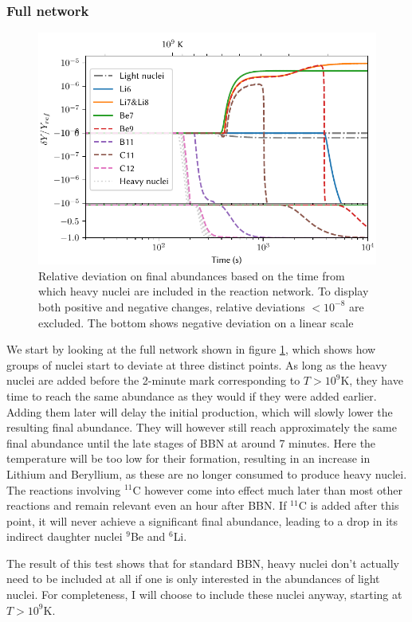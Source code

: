 \subsubsection{Full network}
\begin{figure}[ht!]
    \includegraphics[width=5.1in]{figures/Bignettime.pdf}
    \caption{Relative deviation on final abundances based on the time from which heavy nuclei are included in the reaction network. To display both positive and negative changes, relative deviations $ <10^{-8}$ are excluded. The bottom shows negative deviation on a linear scale}
    \label{fig:bignettime}
\end{figure}
We start by looking at the full network shown in figure \ref{fig:bignettime}, which shows how groups of nuclei start to deviate at three distinct points. As long as the heavy nuclei are added before the 2-minute mark corresponding to $T>10^9$K, they have time to reach the same abundance as they would if they were added earlier. Adding them later will delay the initial production, which will slowly lower the resulting final abundance. They will however still reach approximately the same final abundance until the late stages of BBN at around 7 minutes. Here the temperature will be too low for their formation, resulting in an increase in Lithium and Beryllium, as these are no longer consumed to produce heavy nuclei. 
The reactions involving ${}^{11}$C however come into effect much later than most other reactions and remain relevant even an hour after BBN. If ${}^{11}$C is added after this point, it will never achieve a significant final abundance, leading to a drop in its indirect daughter nuclei ${}^{9}$Be and ${}^{6}$Li. 

The result of this test shows that for standard BBN, heavy nuclei don't actually need to be included at all if one is only interested in the abundances of light nuclei. For completeness, I will choose to include these nuclei anyway, starting at $T>10^9$K. 

